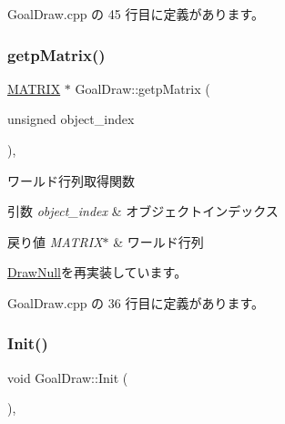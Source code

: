  Goal\+Draw.\+cpp の 45 行目に定義があります。

\mbox{\label{class_goal_draw_a536a23c043576f9032e6651d7644d038}} 
\subsubsection{\texorpdfstring{getp\+Matrix()}{getpMatrix()}}
{\footnotesize\ttfamily \mbox{\hyperlink{_matrix_8h_a032295cd9fb1b711757c90667278e744}{M\+A\+T\+R\+IX}} $\ast$ Goal\+Draw\+::getp\+Matrix (\begin{DoxyParamCaption}\item[{unsigned}]{object\+\_\+index }\end{DoxyParamCaption})\hspace{0.3cm}{\ttfamily [override]}, {\ttfamily [virtual]}}



ワールド行列取得関数 


\begin{DoxyParams}{引数}
{\em object\+\_\+index} & オブジェクトインデックス \\
\hline
\end{DoxyParams}

\begin{DoxyRetVals}{戻り値}
{\em M\+A\+T\+R\+I\+X$\ast$} & ワールド行列 \\
\hline
\end{DoxyRetVals}


\mbox{\hyperlink{class_draw_null_a9aac059eb3b5d1f77e8bd3aa0647cff9}{Draw\+Null}}を再実装しています。



 Goal\+Draw.\+cpp の 36 行目に定義があります。

\mbox{\label{class_goal_draw_a3eb0a555fa2db9d2c1253018ea65796e}} 
\subsubsection{\texorpdfstring{Init()}{Init()}}
{\footnotesize\ttfamily void Goal\+Draw\+::\+Init (\begin{DoxyParamCaption}{ }\end{DoxyParamCaption})\hspace{0.3cm}{\ttfamily [override]}, {\ttfamily [virtual]}}



